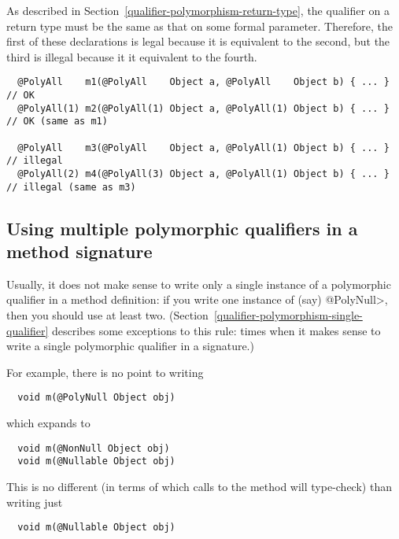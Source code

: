As described in Section~\ref{qualifier-polymorphism-return-type}, the
qualifier on a return type must be the same as that on some formal parameter.
Therefore, the first of these declarations is legal because it is
equivalent to the second, but the third is illegal because it it
equivalent to the fourth.

\begin{Verbatim}
  @PolyAll    m1(@PolyAll    Object a, @PolyAll    Object b) { ... } // OK
  @PolyAll(1) m2(@PolyAll(1) Object a, @PolyAll(1) Object b) { ... } // OK (same as m1)

  @PolyAll    m3(@PolyAll    Object a, @PolyAll(1) Object b) { ... } // illegal
  @PolyAll(2) m4(@PolyAll(3) Object a, @PolyAll(1) Object b) { ... } // illegal (same as m3)
\end{Verbatim}


\subsection{Using multiple polymorphic qualifiers in a method signature\label{qualifier-polymorphism-multiple-qualifiers}}


Usually, it does not make sense to write only a single instance of a polymorphic
qualifier in a method definition:  if you write one instance of (say)
\<@PolyNull>, then you should use at least two.
(Section~\ref{qualifier-polymorphism-single-qualifier} describes some
exceptions to this rule:  times when it makes sense to write a single
polymorphic qualifier in a signature.)

For example, there is no point to writing

\begin{Verbatim}
  void m(@PolyNull Object obj)
\end{Verbatim}

\noindent
which expands to

\begin{Verbatim}
  void m(@NonNull Object obj)
  void m(@Nullable Object obj)
\end{Verbatim}

This is no different (in terms of which calls to the method will
type-check) than writing just

\begin{Verbatim}
  void m(@Nullable Object obj)
\end{Verbatim}

